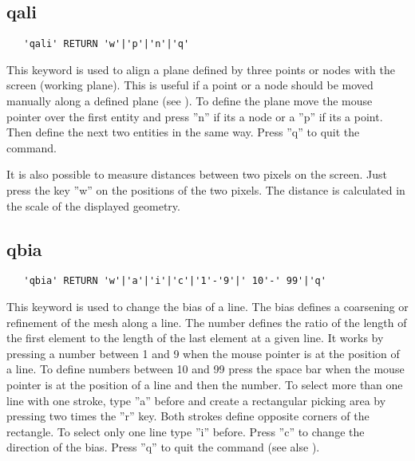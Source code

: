 \documentclass{article}
\begin{document}
\subsection{\label{qali}qali}
\begin{verbatim}
   'qali' RETURN 'w'|'p'|'n'|'q' 
\end{verbatim}
This keyword is used to align a plane defined by three points or nodes with the screen (working plane). This is useful if a point or a node should be moved manually along a defined plane (see ). To define the plane move the mouse pointer over the first entity and press ''n'' if its a node or a ''p'' if its a point. Then define the next two entities in the same way. Press ''q'' to quit the command. 

It is also possible to measure distances between two pixels on the screen. Just press the key ''w'' on the positions of the two pixels. The distance is calculated in the scale of the displayed geometry.

\subsection{\label{qbia}qbia}
\begin{verbatim}
   'qbia' RETURN 'w'|'a'|'i'|'c'|'1'-'9'|' 10'-' 99'|'q' 
\end{verbatim}
This keyword is used to change the bias of a line. The bias defines a coarsening or refinement of the mesh along a line. The number defines the ratio of the length of the first element to the length of the last element at a given line. It works by pressing a number between 1 and 9 when the mouse pointer is at the position of a line. To define numbers between 10 and 99 press the space bar when the mouse pointer is at the position of a line and then the number. To select more than one line with one stroke, type ''a'' before and create a rectangular picking area by pressing two times the ''r'' key. Both strokes define opposite corners of the rectangle. To select only one line type ''i'' before. Press ''c'' to change the direction of the bias. Press ''q'' to quit the command (see alse ). 
\end{document}

